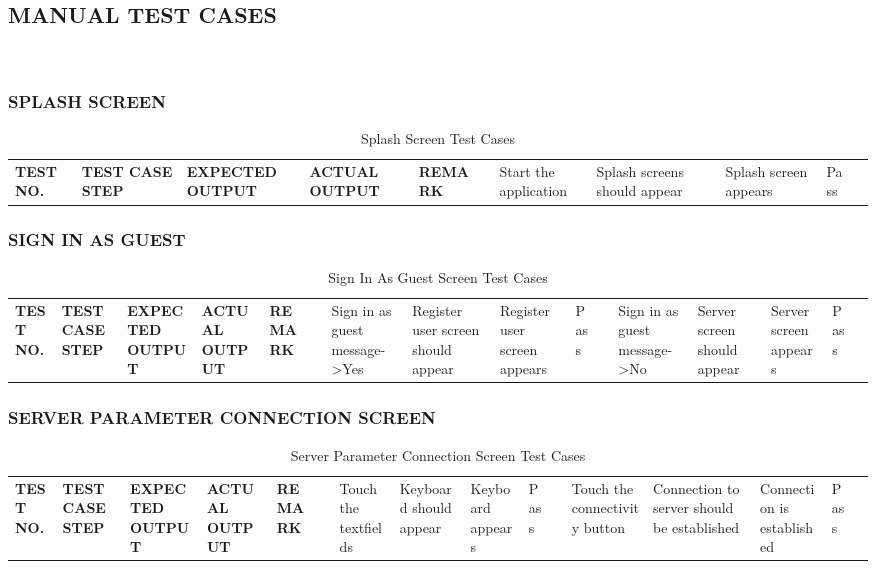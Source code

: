 \documentclass[12pt,a4paper]{article}
\begin{document}
\subsection{MANUAL TEST CASES}
\\
\begin{center}
\vspace{0.1cm}

\newpage
\subsubsection{SPLASH SCREEN}
\begin{center}
\begin{table}
\begin{tabular}{| p{} | p{3 cm} | p{3 cm} | p{3 cm} | p{1 cm} |}
\hline
\textbf{TEST NO.} & \textbf{TEST CASE STEP} & \textbf{EXPECTED OUTPUT} & \textbf{ACTUAL OUTPUT} & \textbf{REMARK} &
 & Start the application &	Splash screens should appear & Splash screen appears & Pass &
\hline
\end{tabular}
\caption{Splash Screen Test Cases}
\end{table}
\end{center}

\subsubsection{SIGN IN AS GUEST}
\begin{center}
\begin{table}
\begin{tabular}{| p{} | p{3 cm} | p{3 cm} | p{3 cm} | p{1 cm} |}
\hline
\textbf{TEST NO.} & \textbf{TEST CASE STEP} & \textbf{EXPECTED OUTPUT} & \textbf{ACTUAL OUTPUT} & \textbf{REMARK} &
 &	Sign in as guest message->Yes &	Register user screen should appear & Register user screen appears & Pass &
 &	Sign in as guest message->No &	Server screen should appear & Server screen appears & Pass &
\hline
\end{tabular}
\caption{Sign In As Guest Screen Test Cases}
\end{table}
\end{center}

\subsubsection{SERVER PARAMETER CONNECTION SCREEN}
\begin{center}
\begin{table}
\begin{tabular}{| p{} | p{3 cm} | p{3 cm} | p{3 cm} | p{1 cm} |}
\hline
\textbf{TEST NO.} & \textbf{TEST CASE STEP} & \textbf{EXPECTED OUTPUT} & \textbf{ACTUAL OUTPUT} & \textbf{REMARK} &
 &	Touch the textfields &	Keyboard should appear & Keyboard appears & Pass &
 &	Touch the connectivity button & Connection to server should be established & Connection is established & Pass &
\hline
\end{tabular}
\caption{Server Parameter Connection Screen Test Cases}
\end{table}
\end{center}


\end{center}
\end{document}
